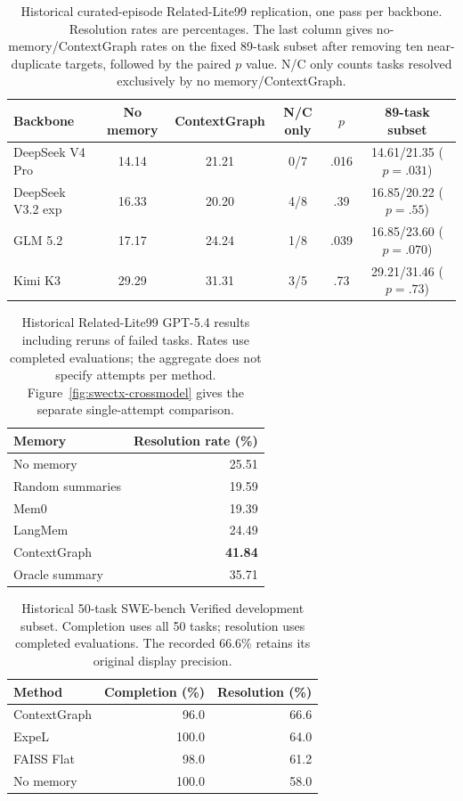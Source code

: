 \begin{table}[htbp]
\centering
\caption{Historical curated-episode Related-Lite99 replication, one pass per
backbone. Resolution rates are percentages. The last column gives
no-memory/ContextGraph rates on the fixed 89-task subset after removing ten
near-duplicate targets, followed by the paired $p$ value.
N/C only counts tasks resolved exclusively by no memory/ContextGraph.}
\label{tab:swectx-xmodel}
\small
\begin{tabular}{lccccc}
\toprule
Backbone & No memory & ContextGraph & N/C only & $p$ & 89-task subset \\
\midrule
DeepSeek V4 Pro & 14.14 & 21.21 & 0/7 & .016 & 14.61/21.35 ($p=.031$) \\
DeepSeek V3.2 exp & 16.33 & 20.20 & 4/8 & .39 & 16.85/20.22 ($p=.55$) \\
GLM 5.2 & 17.17 & 24.24 & 1/8 & .039 & 16.85/23.60 ($p=.070$) \\
Kimi K3 & 29.29 & 31.31 & 3/5 & .73 & 29.21/31.46 ($p=.73$) \\
\bottomrule
\end{tabular}
\end{table}

\begin{table}[htbp]
\centering
\caption{Historical Related-Lite99 GPT-5.4 results including reruns of failed
tasks. Rates use completed evaluations; the aggregate does not specify
attempts per method. Figure~\ref{fig:swectx-crossmodel} gives the separate
single-attempt comparison.}
\label{tab:swectx-v2}
\begin{tabular}{lr}
\toprule
Memory & Resolution rate (\%) \\
\midrule
No memory & 25.51 \\
Random summaries & 19.59 \\
Mem0 & 19.39 \\
LangMem & 24.49 \\
ContextGraph & \textbf{41.84} \\
\midrule
Oracle summary & 35.71 \\
\bottomrule
\end{tabular}
\end{table}

\begin{table}[htbp]
\centering
\caption{Historical 50-task SWE-bench Verified development subset.
Completion uses all 50 tasks; resolution uses completed evaluations.
The recorded 66.6\% retains its original display precision.}
\label{tab:dev50}
\begin{tabular}{lrr}
\toprule
Method & Completion (\%) & Resolution (\%) \\
\midrule
ContextGraph & 96.0 & 66.6 \\
ExpeL & 100.0 & 64.0 \\
FAISS Flat & 98.0 & 61.2 \\
No memory & 100.0 & 58.0 \\
\bottomrule
\end{tabular}
\end{table}

